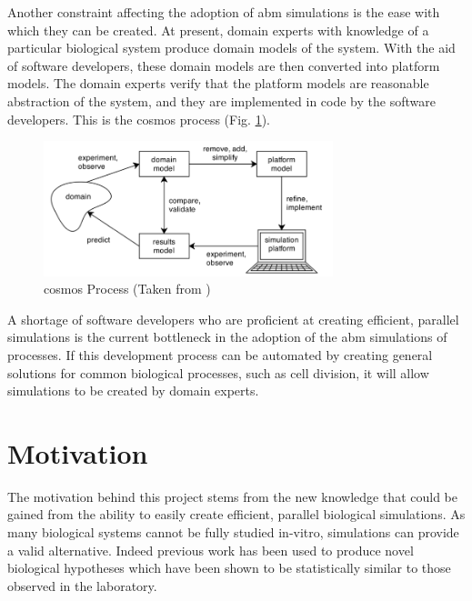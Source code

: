 \documentclass{UoYCSproject}
\begin{document}
Another constraint affecting the adoption of \gls{abm} simulations is the ease with which they can be created.
At present, domain experts with knowledge of a particular biological system produce domain models of the system.
With the aid of software developers, these domain models are then converted into platform models.
The domain experts verify that the platform models are reasonable abstraction of the system, and they are implemented in code by the software developers.
This is the \gls{cosmos} process (Fig. \ref{fig:cosmos_process}).
\label{cosmos_intro}

\begin{figure}[htp]
\centering
\includegraphics[width=0.75\textwidth]{Appendix/CoSMoS_Process}
\caption{\gls{cosmos} Process (Taken from \cite{mark_read_thesis})}
\label{fig:cosmos_process}
\end{figure}

A shortage of software developers who are proficient at creating efficient, parallel simulations is the current bottleneck in the adoption of the \gls{abm} simulations of processes.
If this development process can be automated by creating general solutions for common biological processes, such as cell division, it will allow simulations to be created by domain experts.


\section{Motivation}
The motivation behind this project stems from the new knowledge that could be gained from the ability to easily create efficient, parallel biological simulations.
As many biological systems cannot be fully studied \gls{in-vitro}, simulations can provide a valid alternative.
Indeed previous work has been used to produce novel biological hypotheses which have been shown to be statistically similar to those observed in the laboratory\cite[p.174]{kieran_thesis}.
\end{document}
